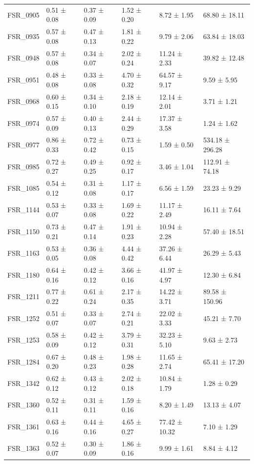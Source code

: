 \begin{tabular}{llllll}
FSR_0905 & 0.51 ± 0.08 & 0.37 ± 0.09 & 1.52 ± 0.20 & 8.72 ± 1.95 & 68.80 ± 18.11 \\
FSR_0935 & 0.57 ± 0.08 & 0.47 ± 0.13 & 1.81 ± 0.22 & 9.79 ± 2.06 & 63.84 ± 18.03 \\
FSR_0948 & 0.57 ± 0.08 & 0.34 ± 0.07 & 2.02 ± 0.24 & 11.24 ± 2.33 & 39.82 ± 12.48 \\
FSR_0951 & 0.48 ± 0.08 & 0.33 ± 0.08 & 4.70 ± 0.32 & 64.57 ± 9.17 & 9.59 ± 5.95 \\
FSR_0968 & 0.60 ± 0.15 & 0.34 ± 0.10 & 2.18 ± 0.19 & 12.14 ± 2.01 & 3.71 ± 1.21 \\
FSR_0974 & 0.57 ± 0.09 & 0.40 ± 0.13 & 2.44 ± 0.29 & 17.37 ± 3.58 & 1.24 ± 1.62 \\
FSR_0977 & 0.86 ± 0.33 & 0.72 ± 0.42 & 0.73 ± 0.15 & 1.59 ± 0.50 & 534.18 ± 296.28 \\
FSR_0985 & 0.72 ± 0.27 & 0.49 ± 0.25 & 0.92 ± 0.17 & 3.46 ± 1.04 & 112.91 ± 74.18 \\
FSR_1085 & 0.54 ± 0.12 & 0.31 ± 0.08 & 1.17 ± 0.17 & 6.56 ± 1.59 & 23.23 ± 9.29 \\
FSR_1144 & 0.53 ± 0.07 & 0.33 ± 0.08 & 1.69 ± 0.22 & 11.17 ± 2.49 & 16.11 ± 7.64 \\
FSR_1150 & 0.73 ± 0.21 & 0.47 ± 0.14 & 1.91 ± 0.23 & 10.94 ± 2.28 & 57.40 ± 18.51 \\
FSR_1163 & 0.53 ± 0.05 & 0.36 ± 0.08 & 4.44 ± 0.42 & 37.26 ± 6.44 & 26.29 ± 5.43 \\
FSR_1180 & 0.64 ± 0.16 & 0.42 ± 0.12 & 3.66 ± 0.16 & 41.97 ± 4.97 & 12.30 ± 6.84 \\
FSR_1211 & 0.77 ± 0.22 & 0.61 ± 0.24 & 2.17 ± 0.35 & 14.22 ± 3.71 & 89.58 ± 150.96 \\
FSR_1252 & 0.51 ± 0.07 & 0.33 ± 0.07 & 2.74 ± 0.21 & 22.02 ± 3.33 & 45.21 ± 7.70 \\
FSR_1253 & 0.58 ± 0.09 & 0.42 ± 0.12 & 3.79 ± 0.31 & 32.23 ± 5.10 & 9.63 ± 2.73 \\
FSR_1284 & 0.67 ± 0.20 & 0.48 ± 0.23 & 1.98 ± 0.28 & 11.65 ± 2.74 & 65.41 ± 17.20 \\
FSR_1342 & 0.62 ± 0.12 & 0.43 ± 0.12 & 2.02 ± 0.18 & 10.84 ± 1.79 & 1.28 ± 0.29 \\
FSR_1360 & 0.52 ± 0.11 & 0.31 ± 0.11 & 1.59 ± 0.16 & 8.20 ± 1.49 & 13.13 ± 4.07 \\
FSR_1361 & 0.63 ± 0.16 & 0.44 ± 0.16 & 4.65 ± 0.27 & 77.42 ± 10.32 & 7.10 ± 1.29 \\
FSR_1363 & 0.52 ± 0.07 & 0.30 ± 0.09 & 1.86 ± 0.16 & 9.99 ± 1.61 & 8.84 ± 4.12 \\

\end{tabular}
